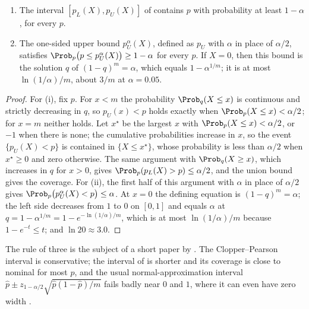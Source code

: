 \begin{refsection}
\begin{proposition}\label{thm:toolkit:clopper}
\begin{enumerate}
\item The interval $[p_L(X),p_U(X)]$ of \textcite{ClopperPearson1934} contains $p$ with probability at least $1-\alpha$, for every $p$.
\item The one-sided upper bound $p_U^{\alpha}(X)$, defined as $p_U$ with $\alpha$ in place of $\alpha/2$, satisfies $\Prob_p\bigl(p\le p_U^{\alpha}(X)\bigr)\ge1-\alpha$ for every $p$. If $X=0$, then this bound is the solution $q$ of $(1-q)^m=\alpha$, which equals $1-\alpha^{1/m}$; it is at most $\ln(1/\alpha)/m$, about $3/m$ at $\alpha=0.05$.
\end{enumerate}
\end{proposition}

\begin{proof}
For (i), fix $p$. For $x<m$ the probability $\Prob_q(X\le x)$ is continuous and strictly decreasing in $q$, so $p_U(x)<p$ holds exactly when $\Prob_p(X\le x)<\alpha/2$; for $x=m$ neither holds. Let $x^\star$ be the largest $x$ with $\Prob_p(X\le x)<\alpha/2$, or $-1$ when there is none; the cumulative probabilities increase in $x$, so the event $\{p_U(X)<p\}$ is contained in $\{X\le x^\star\}$, whose probability is less than $\alpha/2$ when $x^\star\ge0$ and zero otherwise. The same argument with $\Prob_q(X\ge x)$, which increases in $q$ for $x>0$, gives $\Prob_p(p_L(X)>p)\le\alpha/2$, and the union bound gives the coverage. For (ii), the first half of this argument with $\alpha$ in place of $\alpha/2$ gives $\Prob_p\bigl(p_U^{\alpha}(X)<p\bigr)\le\alpha$. At $x=0$ the defining equation is $(1-q)^m=\alpha$; the left side decreases from $1$ to $0$ on $[0,1]$ and equals $\alpha$ at $q=1-\alpha^{1/m}=1-e^{-\ln(1/\alpha)/m}$, which is at most $\ln(1/\alpha)/m$ because $1-e^{-t}\le t$; and $\ln20\approx3.0$.
\end{proof}

The rule of three is the subject of a short paper by \textcite{HanleyLippmanHand1983}. The Clopper--Pearson interval is conservative; the interval of \textcite{Wilson1927} is shorter and its coverage is close to nominal for most $p$, and the usual normal-approximation interval $\hat p\pm z_{1-\alpha/2}\sqrt{\hat p(1-\hat p)/m}$ fails badly near $0$ and $1$, where it can even have zero width \parencite{BrownCaiDasGupta2001}.

\notesandrefs


\end{refsection}
